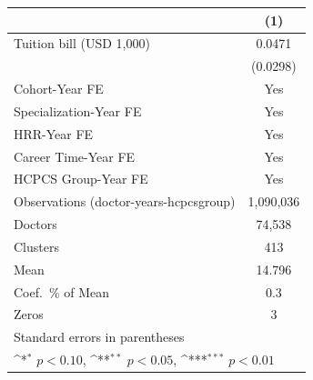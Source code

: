{
\def\sym#1{\ifmmode^{#1}\else\(^{#1}\)\fi}
\begin{tabular}{l*{1}{c}}
\hline\hline
                    &\multicolumn{1}{c}{(1)}         \\
\hline
Tuition bill (USD 1,000)&      0.0471         \\
                    &    (0.0298)         \\
[1em]
Cohort-Year FE      &         Yes         \\
[1em]
Specialization-Year FE&         Yes         \\
[1em]
HRR-Year FE         &         Yes         \\
[1em]
Career Time-Year FE &         Yes         \\
[1em]
HCPCS Group-Year FE &         Yes         \\
\hline
Observations (doctor-years-hcpcsgroup)&   1,090,036         \\
Doctors             &      74,538         \\
Clusters            &         413         \\
Mean                &      14.796         \\
Coef.\ \% of Mean   &         0.3         \\
Zeros               &           3         \\
\hline\hline
\multicolumn{2}{l}{\footnotesize Standard errors in parentheses}\\
\multicolumn{2}{l}{\footnotesize \sym{*} \(p<0.10\), \sym{**} \(p<0.05\), \sym{***} \(p<0.01\)}\\
\end{tabular}
}

